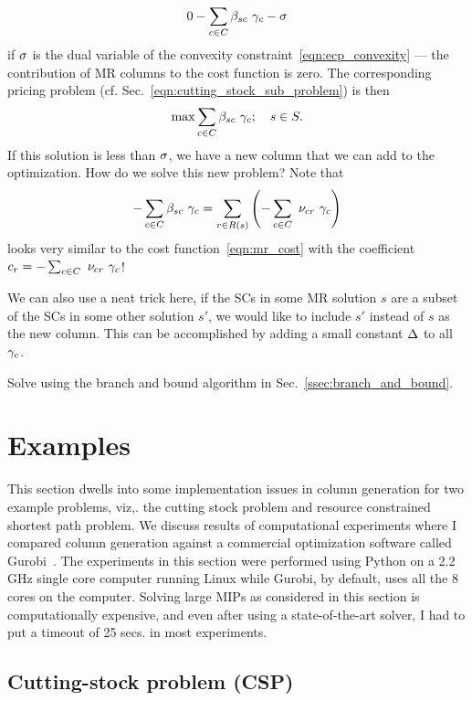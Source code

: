 \documentclass[letterpaper, 10pt, twocolumn, reqno]{amsart}
\begin{document}
{\begin{enumerate}[(a)]
            $$
            0 - \sum_{c \in C} \beta_{sc}\ \gamma_c - \sigma
            $$
            if $\sigma$ is the dual variable of the convexity constraint~\eqref{eqn:ecp_convexity} --- the contribution of MR columns to the cost function is zero. The corresponding pricing problem (cf. Sec.~\ref{eqn:cutting_stock_sub_problem}) is then
            $$
            \max \sum_{c \in C} \beta_{sc}\ \gamma_c; \quad s \in S.
            $$
            If this solution is less than $\sigma$, we have a new column that we can add to the optimization. How do we solve this new problem? Note that
            $$
            -\sum_{c \in C} \beta_{sc}\ \gamma_c = \sum_{r \in R(s)} \left(-\sum_{c \in C}\ \nu_{cr}\ \gamma_c\right)
            $$
            looks very similar to the cost function~\eqref{eqn:mr_cost} with the coefficient $c_r = -\sum_{c \in C}\ \nu_{cr}\ \g_c$!

            We can also use a neat trick here, if the SCs in some MR solution $s$ are a subset of the SCs in some other solution $s'$, we would like to include $s'$ instead of $s$ as the new column. This can be accomplished by adding a small constant $\Delta$ to all $\gamma_c$.
        \end{enumerate}

    \item Solve using the branch and bound algorithm in Sec.~\ref{ssec:branch_and_bound}.

}

\section{Examples}
\label{sec:examples}

This section dwells into some implementation issues in column generation for two example problems, viz,. the cutting stock problem and resource constrained
shortest path problem. We discuss results of computational experiments where I compared column generation against a commercial optimization software called
Gurobi~\cite{gurobi}. The experiments in this section were performed using Python on a 2.2 GHz single core computer running Linux while Gurobi, by default, uses all the 8 cores on the computer.
Solving large MIPs as considered in this section is computationally expensive, and even after using a state-of-the-art solver, I had to put a timeout of 25 secs. in most experiments.

\subsection{Cutting-stock problem (CSP)}
\label{ssec:eg_cutting_stock}
\end{document}
